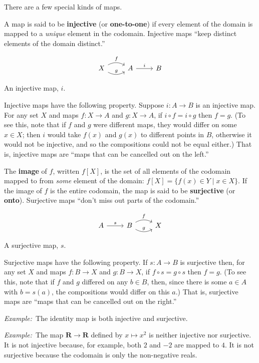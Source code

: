 \documentclass[12pt, a4paper]{article}
\newcommand{\defn}[1]{\textbf{#1}}
\newcommand{\set}[1]{\mathbold{#1}}
\newcommand{\eg}{\emph{Example:}\relax}
\begin{document}
There are a few special kinds of maps. 
 
A map is said to be \defn{injective} (or \defn{one-to-one}) if every
element of the domain is mapped to a \emph{unique} element in the
codomain. Injective maps “keep distinct elements of the domain
distinct.”

\begin{sidefigure}
\[\begin{tikzcd}
  X \arrow[r, bend left, "f"] \arrow [r, bend right, "g"] & A \arrow[r, "i"] & B
\end{tikzcd}\]
  \caption{An injective map, $i$.\label{fig:injection}}
\end{sidefigure}
Injective maps have the following property. Suppose $i\colon A\to B$ is
an injective map. For any set $X$ and maps $f\colon X\to A$ and $g\colon
X\to A$, if $i\circ f = i\circ g$ then $f = g$. (To see this, note that if $f$
and $g$ were different maps, they would differ on some $x \in X$; then
$i$ would take $f(x)$ and $g(x)$ to different points in $B$, otherwise
it would not be injective, and so the compositions could not be equal
either.) That is, injective maps are “maps that can be cancelled out
on the left.”

The \defn{image} of $f$, written $f[X]$, is the set of all elements of
the codomain mapped to from \emph{some} element of the domain: $f[X] =
\{f(x) \in Y \mid x\in X\}$. If the image of $f$ is the entire codomain, the
map is said to be \defn{surjective} (or \defn{onto}). Surjective maps
“don't miss out parts of the codomain.”

\begin{sidefigure}
\[\begin{tikzcd}
  A \arrow[r, "s"] & B \arrow[r, bend left, "f"] \arrow [r, bend right, "g"] & X 
\end{tikzcd}\]
  \caption{A surjective map, $s$.\label{fig:surjection}}
\end{sidefigure}
Surjective maps have the following property. If $s\colon A\to B$ is
surjective then, for any set $X$ and maps $f\colon B\to X$ and $g\colon
B\to X$, if $f\circ s = g\circ s$ then $f = g$. (To see this, note that if $f$
and $g$ differed on any $b\in B$, then, since there is some $a\in A$ with
$b = s(a)$, the compositions would differ on this $a$.) That is,
surjective maps are “maps that can be cancelled out on the right.”

\eg\ The identity map is both injective and surjective.

\eg\ The map $\set{R}\to\set{R}$ defined by $x\mapsto x^2$ is neither
injective nor surjective. It is not injective because, for example,
both $2$ and $-2$ are mapped to $4$. It is not surjective because the
codomain is only the non-negative reals.
\end{document}
